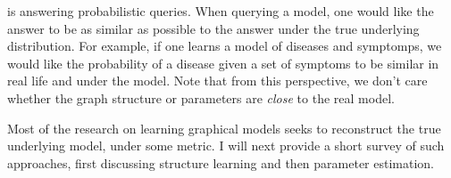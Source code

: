 
is answering probabilistic queries.
When querying a model, one would like the answer to be as similar as possible to the answer under the true underlying distribution.
For example, if one learns a model of diseases and symptomps, we would like the probability of a disease given a set of symptoms to be similar in real life and under the model.
Note that from this perspective, we don't care whether the graph structure or parameters are {\em close} to the real model. 



Most of the research on learning graphical models seeks to reconstruct the true underlying model, under some metric. I will next provide a short survey of such approaches, first discussing structure learning and then parameter estimation.



